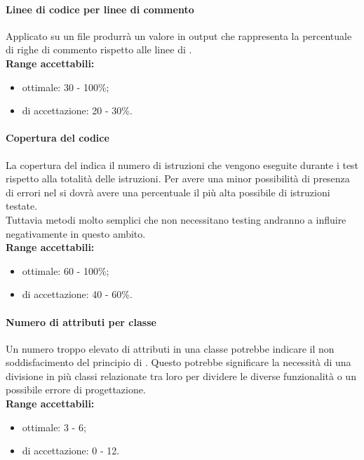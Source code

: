 \documentclass{scalatekids-article}
\begin{document}
\paragraph{Linee di codice per linee di commento}
Applicato su un file produrrà un valore in output che rappresenta la percentuale di righe di commento rispetto alle linee di .\\
\textbf{Range accettabili:}
\begin{itemize}
\item {} ottimale: 30 - 100\%;
\item {} di accettazione: 20 - 30\%.
\end{itemize}

\paragraph{Copertura del codice}
La copertura del  indica il numero di istruzioni che vengono eseguite durante i test rispetto alla totalità delle istruzioni. Per avere una minor possibilità di presenza di errori nel  si dovrà avere una percentuale il più alta possibile di istruzioni testate.\\Tuttavia metodi molto semplici che non necessitano testing andranno a influire negativamente in questo ambito.\\
\textbf{Range accettabili:}
\begin{itemize}
\item {} ottimale: 60 - 100\%;
\item {} di accettazione: 40 - 60\%.
\end{itemize}

\paragraph{Numero di attributi per classe}
Un numero troppo elevato di attributi in una classe potrebbe indicare il non soddisfacimento del principio di \textit{}. Questo potrebbe significare la necessità di una divisione in più classi relazionate tra loro per dividere le diverse funzionalità o un possibile errore di progettazione.\\
\textbf{Range accettabili:}
\begin{itemize}
\item {} ottimale: 3 - 6;
\item {} di accettazione: 0 - 12.
\end{itemize}
\end{document}
